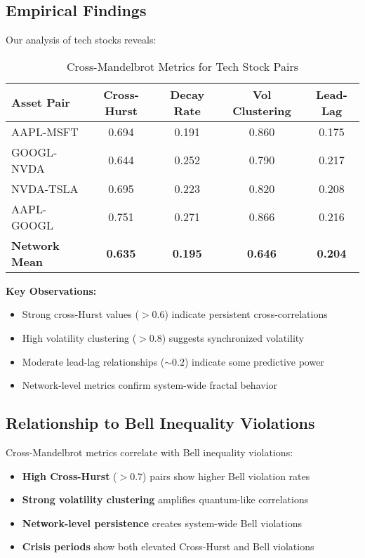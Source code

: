 \documentclass[11pt,a4paper]{article}
\begin{document}
\subsection{Empirical Findings}

Our analysis of tech stocks reveals:

\begin{table}[h]
\centering
\caption{Cross-Mandelbrot Metrics for Tech Stock Pairs}
\label{tab:cross_mandelbrot}
\begin{tabular}{@{}lcccc@{}}
\toprule
\textbf{Asset Pair} & \textbf{Cross-Hurst} & \textbf{Decay Rate} & \textbf{Vol Clustering} & \textbf{Lead-Lag} \\
\midrule
AAPL-MSFT & 0.694 & 0.191 & 0.860 & 0.175 \\
GOOGL-NVDA & 0.644 & 0.252 & 0.790 & 0.217 \\
NVDA-TSLA & 0.695 & 0.223 & 0.820 & 0.208 \\
AAPL-GOOGL & 0.751 & 0.271 & 0.866 & 0.216 \\
\textbf{Network Mean} & \textbf{0.635} & \textbf{0.195} & \textbf{0.646} & \textbf{0.204} \\
\bottomrule
\end{tabular}
\end{table}

\textbf{Key Observations:}
\begin{itemize}
    \item Strong cross-Hurst values ($> 0.6$) indicate persistent cross-correlations
    \item High volatility clustering ($> 0.8$) suggests synchronized volatility
    \item Moderate lead-lag relationships ($\sim 0.2$) indicate some predictive power
    \item Network-level metrics confirm system-wide fractal behavior
\end{itemize}

\subsection{Relationship to Bell Inequality Violations}

Cross-Mandelbrot metrics correlate with Bell inequality violations:

\begin{itemize}
    \item \textbf{High Cross-Hurst} ($> 0.7$) pairs show higher Bell violation rates
    \item \textbf{Strong volatility clustering} amplifies quantum-like correlations
    \item \textbf{Network-level persistence} creates system-wide Bell violations
    \item \textbf{Crisis periods} show both elevated Cross-Hurst and Bell violations
\end{itemize}
\end{document}
